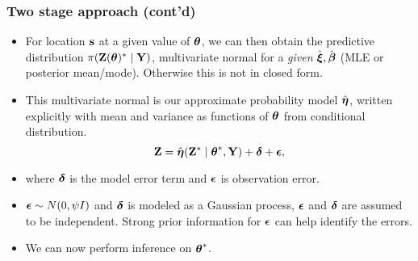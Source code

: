 \documentclass{beamer}
\begin{document}
\begin{frame}
  \frametitle{Two stage approach (cont'd)}
    \begin{itemize}
    \item For location ${\bf s}$ at a given value of $\mbox{\boldmath $\theta$}$, we
      can then obtain the predictive distribution $\pi({\bf Z}(\mbox{\boldmath $\theta$})^*
      \mid {\bf Y})$, multivariate normal for a {\it given } $\hat{\mbox{\boldmath $\xi$}},
      \hat{\mbox{\boldmath $\beta$}}$ (MLE or posterior mean/mode). Otherwise this is not in
      closed form.
     \item  This multivariate normal is our approximate probability
       model $\hat{\mbox{\boldmath $\eta$}}$, written explicitly with mean and variance as functions of $\mbox{\boldmath $\theta$}$ from conditional distribution.
   $${\bf Z}=\hat{\mbox{\boldmath $\eta$}}({\bf Z}^* \mid \mbox{\boldmath $\theta$}^*, {\bf Y})+\mbox{\boldmath $\delta$}+\mbox{\boldmath $\epsilon$}, $$
    \item where $\mbox{\boldmath $\delta$}$ is the model error term and  $\mbox{\boldmath $\epsilon$}$ is observation error.  
    \item $\mbox{\boldmath $\epsilon$} \sim N(0,\psi I)$ and $\mbox{\boldmath $\delta$}$ is modeled as a
      Gaussian process, $\mbox{\boldmath $\epsilon$}$ and $\mbox{\boldmath $\delta$}$ are assumed to be
      independent. Strong prior information for $\mbox{\boldmath $\epsilon$}$ can help identify the errors.
    \item We can now perform inference on $\mbox{\boldmath $\theta$}^*$.    
      \end{itemize}
       
\end{frame}
\end{document}
